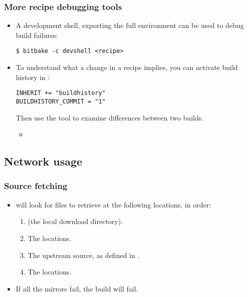 \begin{frame}[fragile]
  \frametitle{More recipe debugging tools}
  \begin{itemize}
    \item A development shell, exporting the full environment can be
      used to debug build failures:
      \begin{block}{}
        \begin{verbatim}
$ bitbake -c devshell <recipe>
        \end{verbatim}
      \end{block}
    \item To understand what a change in a recipe implies, you can
      activate build history in :
      \begin{block}{}
        \begin{verbatim}
INHERIT += "buildhistory"
BUILDHISTORY_COMMIT = "1"
        \end{verbatim}
      \end{block}
      Then use the  tool to examine
      differences between two builds.
      \begin{itemize}
        \item {}
      \end{itemize}
  \end{itemize}
\end{frame}

\subsection{Network usage}

\begin{frame}
  \frametitle{Source fetching}
  \begin{itemize}
    \item {} will look for files to retrieve at the following
      locations, in order:
      \begin{enumerate}
        \item {} (the local download directory).
        \item The  locations.
        \item The upstream source, as defined in .
        \item The  locations.
      \end{enumerate}
    \item If all the mirrors fail, the build will fail.
  \end{itemize}
\end{frame}

